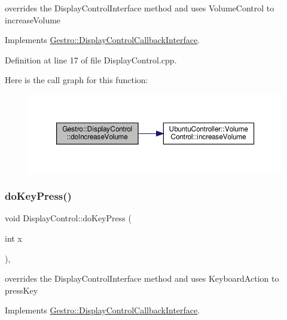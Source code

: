 overrides the Display\+Control\+Interface method and uses Volume\+Control to increase\+Volume 

Implements \hyperlink{class_gestro_1_1_display_control_callback_interface_af26f63171de9622c5723363732f590c8}{Gestro\+::\+Display\+Control\+Callback\+Interface}.



Definition at line 17 of file Display\+Control.\+cpp.

Here is the call graph for this function\+:
\nopagebreak
\begin{figure}[H]
\begin{center}
\leavevmode
\includegraphics[width=350pt]{class_gestro_1_1_display_control_a8a361b4c25ef55b86b5c2d178ffa516f_cgraph}
\end{center}
\end{figure}
\mbox{\label{class_gestro_1_1_display_control_aa5af48425f7ba40012b2a7db5fabed45}} 
\subsubsection{\texorpdfstring{do\+Key\+Press()}{doKeyPress()}}
{\footnotesize\ttfamily void Display\+Control\+::do\+Key\+Press (\begin{DoxyParamCaption}\item[{int}]{x }\end{DoxyParamCaption})\hspace{0.3cm}{\ttfamily [override]}, {\ttfamily [virtual]}}

overrides the Display\+Control\+Interface method and uses Keyboard\+Action to press\+Key 

Implements \hyperlink{class_gestro_1_1_display_control_callback_interface_aa6d1e75bb4b3aa0b0e10497576b1053f}{Gestro\+::\+Display\+Control\+Callback\+Interface}.



